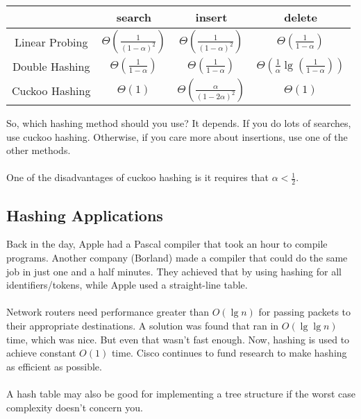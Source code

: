 \documentclass[]{article}
\theoremstyle{definition}
\begin{document}
					\begin{center}
						\begin{tabular}{|c|c|c|c|}
							\hline
							& search & insert & delete \\ \hline
							Linear Probing & $\Theta \left( \frac{1}{(1 - \alpha)^2} \right)$ & $\Theta \left( \frac{1}{(1 - \alpha)^2} \right)$ & $\Theta \left( \frac{1}{1 - \alpha} \right)$ \\ \hline
							Double Hashing & $\Theta \left( \frac{1}{1 - \alpha} \right)$ & $\Theta \left( \frac{1}{1 - \alpha} \right)$ & $\Theta \left( \frac{1}{\alpha} \lg \left( \frac{1}{1 - \alpha} \right) \right)$ \\ \hline
							Cuckoo Hashing & $\Theta \left( 1 \right)$ & $\Theta \left( \frac{\alpha}{(1 - 2 \alpha)^2} \right)$ & $\Theta \left( 1 \right)$ \\ \hline
						\end{tabular}
					\end{center}

					So, which hashing method should you use? It depends. If you do lots of searches, use cuckoo hashing. Otherwise, if you care more about insertions, use one of the other methods.
					\\ \\
					One of the disadvantages of cuckoo hashing is it requires that $\alpha < \frac{1}{2}$.

		\subsection{Hashing Applications}
        Back in the day, Apple had a Pascal compiler that took an hour to compile programs. Another company (Borland) made a compiler that could do the same job in just one and a half minutes. They achieved that by using hashing for all identifiers/tokens, while Apple used a straight-line table.
			\\ \\
			Network routers need performance greater than $O(\lg n)$ for passing packets to their appropriate destinations. A solution was found that ran in $O(\lg \lg n)$ time, which was nice. But even that wasn't fast enough. Now, hashing is used to achieve constant $O(1)$ time. Cisco continues to fund research to make hashing as efficient as possible.
			\\ \\
			A hash table may also be good for implementing a tree structure if the worst case complexity doesn't concern you.
\end{document}
